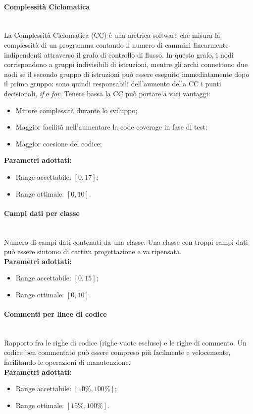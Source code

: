 \paragraph{Complessità Ciclomatica}\mbox{}\\[0,3cm]
La Complessità Ciclomatica (CC) è una metrica software che misura la complessità di un programma contando il numero di cammini linearmente indipendenti attraverso il grafo di controllo di flusso. In questo grafo, i nodi corrispondono a gruppi indivisibili di istruzioni, mentre gli archi connettono due nodi se il secondo gruppo di istruzioni può essere eseguito immediatamente dopo il primo gruppo: sono quindi responsabili dell'aumento della CC i punti decisionali, \emph{if} e \emph{for}.
Tenere bassa la CC può portare a vari vantaggi:
\begin{itemize}
	\item Minore complessità durante lo sviluppo;
	\item Maggior facilità nell'aumentare la code coverage in fase di test;
	\item Maggior coesione del codice;
\end{itemize}
\textbf{Parametri adottati:}
\begin{itemize}
	\item Range accettabile: $[0,17]$;
	\item Range ottimale: $[0,10]$.
\end{itemize}

\paragraph{Campi dati per classe}\mbox{}\\[0,3cm]
Numero di campi dati contenuti da una classe. Una classe con troppi campi dati può essere sintomo di cattiva progettazione e va ripensata.\\[0,2cm]
\textbf{Parametri adottati:}
\begin{itemize}
	\item Range accettabile: $[0,15]$;
	\item Range ottimale: $[0,10]$.
\end{itemize}

\paragraph{Commenti per linee di codice}\mbox{}\\[0,3cm]
Rapporto fra le righe di codice (righe vuote escluse) e le righe di commento. Un codice ben commentato può essere compreso più facilmente e velocemente, facilitando le operazioni di manutenzione.\\[0,2cm]
\textbf{Parametri adottati:}
\begin{itemize}
	\item Range accettabile: $[10\%,100\%]$;
	\item Range ottimale: $[15\%,100\%]$.
\end{itemize}

